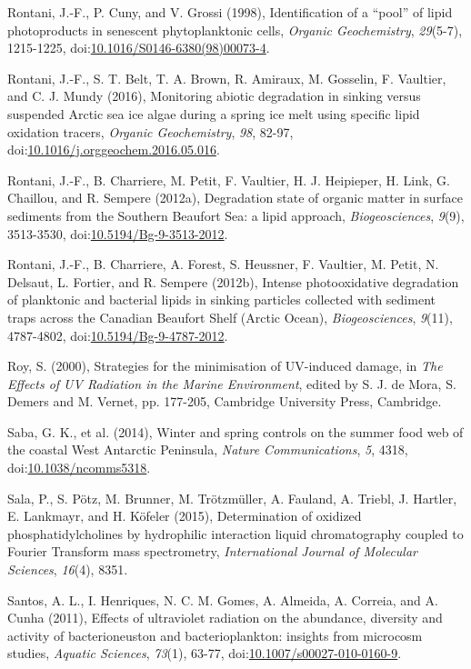 \begin{singlespace}
{{Rontani, J.-F., P. Cuny, and V. Grossi (1998), Identification of a ``pool'' of lipid photoproducts in senescent phytoplanktonic cells, \emph{Organic Geochemistry}, \emph{29}(5-7), 1215-1225, doi:\href{http://dx.doi.org/10.1016/S0146-6380(98)00073-4}{10.1016/S0146-6380(98)00073-4}.

Rontani, J.-F., S. T. Belt, T. A. Brown, R. Amiraux, M. Gosselin, F. Vaultier, and C. J. Mundy (2016), Monitoring abiotic degradation in sinking versus suspended Arctic sea ice algae during a spring ice melt using specific lipid oxidation tracers, \emph{Organic Geochemistry}, \emph{98}, 82-97, doi:\href{http://dx.doi.org/10.1016/j.orggeochem.2016.05.016}{10.1016/j.orggeochem.2016.05.016}.

Rontani, J.-F., B. Charriere, M. Petit, F. Vaultier, H. J. Heipieper, H. Link, G. Chaillou, and R. Sempere (2012a), Degradation state of organic matter in surface sediments from the Southern Beaufort Sea: a lipid approach, \emph{Biogeosciences}, \emph{9}(9), 3513-3530, doi:\href{http://dx.doi.org/10.5194/Bg-9-3513-2012}{10.5194/Bg-9-3513-2012}.

Rontani, J.-F., B. Charriere, A. Forest, S. Heussner, F. Vaultier, M. Petit, N. Delsaut, L. Fortier, and R. Sempere (2012b), Intense photooxidative degradation of planktonic and bacterial lipids in sinking particles collected with sediment traps across the Canadian Beaufort Shelf (Arctic Ocean), \emph{Biogeosciences}, \emph{9}(11), 4787-4802, doi:\href{http://dx.doi.org/10.5194/Bg-9-4787-2012}{10.5194/Bg-9-4787-2012}.

Roy, S. (2000), Strategies for the minimisation of UV-induced damage, in \emph{The Effects of UV Radiation in the Marine Environment}, edited by S. J. de Mora, S. Demers and M. Vernet, pp. 177-205, Cambridge University Press, Cambridge.

Saba, G. K., et al. (2014), Winter and spring controls on the summer food web of the coastal West Antarctic Peninsula, \emph{Nature Communications}, \emph{5}, 4318, doi:\href{http://dx.doi.org/10.1038/ncomms5318}{10.1038/ncomms5318}.

Sala, P., S. P\"{o}tz, M. Brunner, M. Tr\"{o}tzm\"{u}ller, A. Fauland, A. Triebl, J. Hartler, E. Lankmayr, and H. K\"{o}feler (2015), Determination of oxidized phosphatidylcholines by hydrophilic interaction liquid chromatography coupled to Fourier Transform mass spectrometry, \emph{International Journal of Molecular Sciences}, \emph{16}(4), 8351.

Santos, A. L., I. Henriques, N. C. M. Gomes, A. Almeida, A. Correia, and A. Cunha (2011), Effects of ultraviolet radiation on the abundance, diversity and activity of bacterioneuston and bacterioplankton: insights from microcosm studies, \emph{Aquatic Sciences}, \emph{73}(1), 63-77, doi:\href{http://dx.doi.org/10.1007/s00027-010-0160-9}{10.1007/s00027-010-0160-9}.

}}
\end{singlespace}
